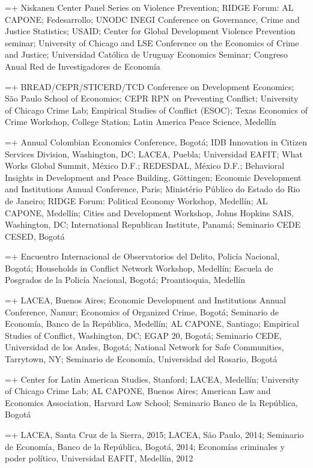 \documentclass[10pt]{article}
\newlength{\datecolwidth}
\newlength{\gapwidth}
\newcommand{\cventry}[2]{%
  \par\hangindent=\dimexpr\datecolwidth+\gapwidth\relax\hangafter=1
  \noindent\makebox[\datecolwidth][l]{#1}\hspace{\gapwidth}#2\par\vspace{0.1ex}}
\begin{document}
\cventry{2021}{ Niskanen Center Panel Series on Violence Prevention; RIDGE Forum: AL CAPONE; Fedesarrollo; UNODC INEGI Conference on Governance, Crime and Justice Statistics; USAID; Center for Global Development Violence Prevention seminar; University of Chicago and LSE Conference on the Economics of Crime and Justice; Universidad Cat\'{o}lica de Uruguay Economics Seminar; Congreso Anual Red de Investigadores de Econom\'{i}a}
\cventry{2020}{BREAD/CEPR/STICERD/TCD Conference on Development Economics; S\~{a}o Paulo School of Economics; CEPR RPN on Preventing Conflict; University of Chicago Crime Lab; Empirical Studies of Conflict (ESOC); Texas Economics of Crime Workshop, College Station; Latin America Peace Science, Medell\'{i}n}
\cventry{2019}{Annual Colombian Economics Conference, Bogot\'{a}; IDB Innovation in Citizen Services Division, Washington, DC; LACEA, Puebla; Universidad EAFIT; What Works Global Summit, M\'{e}xico D.F.; REDESDAL, M\'{e}xico D.F.; Behavioral Insights in Development and Peace Building, G\"{o}ttingen; Economic Development and Institutions Annual Conference, Paris; Minist\'{e}rio P\'{u}blico do Estado do Rio de Janeiro; RIDGE Forum: Political Economy Workshop, Medell\'{i}n; AL CAPONE, Medell\'{i}n; Cities and Development Workshop, Johns Hopkins SAIS, Washington, DC; International Republican Institute, Panam\'{a}; Seminario CEDE CESED, Bogot\'{a}}
\cventry{2018}{Encuentro Internacional de Observatorios del Delito, Polic\'{i}a Nacional, Bogot\'{a}; Households in Conflict Network Workshop, Medell\'{i}n; Escuela de Posgrados de la Polic\'{i}a Nacional, Bogot\'{a}; Proantioquia, Medell\'{i}n}
\cventry{2017}{ LACEA, Buenos Aires; Economic Development and Institutions Annual Conference, Namur; Economics of Organized Crime, Bogot\'{a}; Seminario de Econom\'{i}a, Banco de la Rep\'{u}blica, Medell\'{i}n; AL CAPONE, Santiago; Empirical Studies of Conflict, Washington, DC; EGAP 20, Bogot\'{a}; Seminario CEDE, Universidad de los Andes, Bogot\'{a}; National Network for Safe Communities, Tarrytown, NY; Seminario de Econom\'{i}a, Universidad del Rosario, Bogot\'{a}}
\cventry{2016}{Center for Latin American Studies, Stanford; LACEA, Medell\'{i}n; University of Chicago Crime Lab; AL CAPONE, Buenos Aires; American Law and Economics Association, Harvard Law School; Seminario Banco de la Rep\'{u}blica, Bogot\'{a}}
\cventry{2012--15}{LACEA, Santa Cruz de la Sierra, 2015; LACEA, S\~{a}o Paulo, 2014; Seminario de Econom\'{i}a, Banco de la Rep\'{u}blica, Bogot\'{a}, 2014; Econom\'{i}as criminales y poder pol\'{i}tico, Universidad EAFIT, Medell\'{i}n, 2012}
\end{document}
